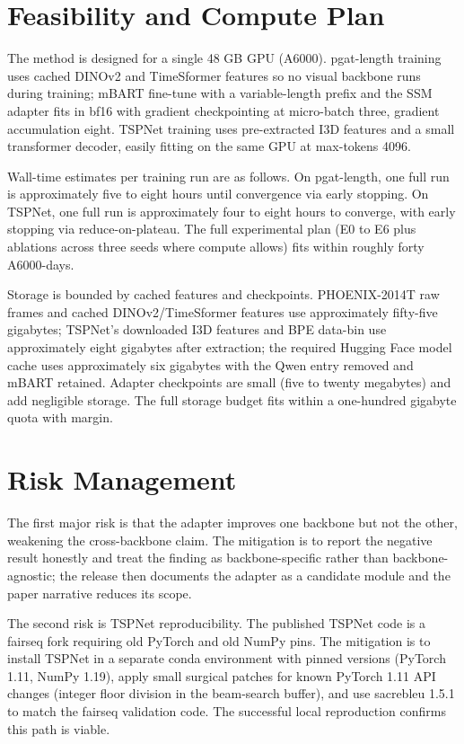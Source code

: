 \section{Feasibility and Compute Plan}

The method is designed for a single 48 GB GPU (A6000). pgat-length training uses cached DINOv2 and TimeSformer features so no visual backbone runs during training; mBART fine-tune with a variable-length prefix and the SSM adapter fits in bf16 with gradient checkpointing at micro-batch three, gradient accumulation eight. TSPNet training uses pre-extracted I3D features and a small transformer decoder, easily fitting on the same GPU at max-tokens 4096.

Wall-time estimates per training run are as follows. On pgat-length, one full run is approximately five to eight hours until convergence via early stopping. On TSPNet, one full run is approximately four to eight hours to converge, with early stopping via reduce-on-plateau. The full experimental plan (E0 to E6 plus ablations across three seeds where compute allows) fits within roughly forty A6000-days.

Storage is bounded by cached features and checkpoints. PHOENIX-2014T raw frames and cached DINOv2/TimeSformer features use approximately fifty-five gigabytes; TSPNet's downloaded I3D features and BPE data-bin use approximately eight gigabytes after extraction; the required Hugging Face model cache uses approximately six gigabytes with the Qwen entry removed and mBART retained. Adapter checkpoints are small (five to twenty megabytes) and add negligible storage. The full storage budget fits within a one-hundred gigabyte quota with margin.

\section{Risk Management}

The first major risk is that the adapter improves one backbone but not the other, weakening the cross-backbone claim. The mitigation is to report the negative result honestly and treat the finding as backbone-specific rather than backbone-agnostic; the release then documents the adapter as a candidate module and the paper narrative reduces its scope.

The second risk is TSPNet reproducibility. The published TSPNet code is a fairseq fork requiring old PyTorch and old NumPy pins. The mitigation is to install TSPNet in a separate conda environment with pinned versions (PyTorch 1.11, NumPy 1.19), apply small surgical patches for known PyTorch 1.11 API changes (integer floor division in the beam-search buffer), and use sacrebleu 1.5.1 to match the fairseq validation code. The successful local reproduction confirms this path is viable.

